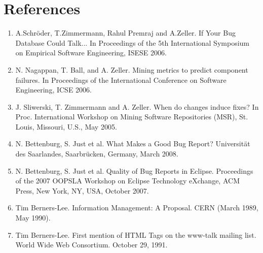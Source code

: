 \documentclass[12pt,a4paper,final]{article}
\begin{document}
\section{References}
\begin{enumerate}
\item A.Schröder, T.Zimmermann, Rahul Premraj and A.Zeller. If Your Bug Database Could Talk... In Proceedings of the 5th International Symposium on Empirical Software Engineering, ISESE 2006. 
\item N. Nagappan, T. Ball, and A. Zeller. Mining metrics to predict
component failures. In Proceedings of the International
Conference on Software Engineering, ICSE 2006.
\item J. Sliwerski, T. Zimmermann and A. Zeller. When do changes
induce fixes? In Proc. International Workshop on Mining
Software Repositories (MSR), St. Louis, Missouri, U.S., May
2005.
\item N. Bettenburg, S. Just et al. What Makes a Good Bug Report? Universität des Saarlandes, Saarbrücken, Germany, March 2008. 
\item N. Bettenburg, S. Just et al. Quality of Bug Reports in Eclipse. Proceedings of the 2007 OOPSLA Workshop on Eclipse Technology eXchange, ACM Press, New York, NY, USA, October 2007. 
\item Tim Berners-Lee. Information Management: A Proposal. CERN (March 1989, May 1990).
\item Tim Berners-Lee. First mention of HTML Tags on the www-talk mailing list. World Wide Web Consortium. October 29, 1991.
\end{enumerate}
\end{document}
